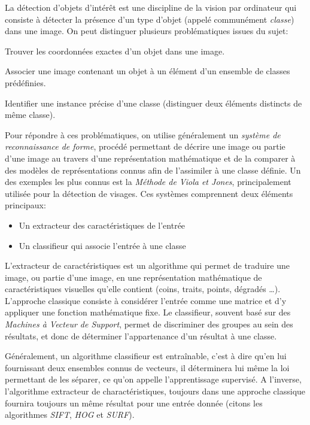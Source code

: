 			La détection d'objets d'intérêt est une discipline de la vision par ordinateur qui consiste à détecter la présence d'un type d'objet (appelé communément \emph{classe}) dans une image. On peut distinguer plusieurs problématiques issues du sujet:
			\begin{description}[noitemsep]
				\item[Localisation:] Trouver les coordonnées exactes d'un objet dans une image.
				\item[Classification:] Associer une image contenant un objet à un élément d'un ensemble de classes prédéfinies.
				\item[Reconnaissance:] Identifier une instance précise d'une classe (distinguer deux éléments distincts de même classe).
			\end{description}
			Pour répondre à ces problématiques, on utilise généralement un \emph{système de reconnaissance de forme}, procédé permettant de décrire une image ou partie d'une image au travers d'une représentation mathématique et de la comparer à des modèles de représentations connus afin de l'assimiler à une classe définie. Un des exemples les plus connus est la \emph{Méthode de Viola et Jones}\cite{viola}, principalement utilisée pour la détection de visages. Ces systèmes comprennent deux éléments principaux:
			\begin{itemize}[noitemsep]
				\item Un extracteur des caractéristiques de l'entrée
				\item Un classifieur qui associe l'entrée à une classe
			\end{itemize}
			L'extracteur de caractéristiques est un algorithme qui permet de traduire une image, ou partie d'une image, en une représentation mathématique de caractéristiques visuelles qu'elle contient (coins, traits, points, dégradés \dots). L'approche classique consiste à considérer l'entrée comme une matrice et d'y appliquer une fonction mathématique fixe.
			Le classifieur, souvent basé sur des \emph{Machines à Vecteur de Support}\cite{svm}, permet de discriminer des groupes au sein des résultats, et donc de déterminer l'appartenance d'un résultat à une classe.
			\par
			Généralement, un algorithme classifieur est entraînable, c'est à dire qu'en lui fournissant deux ensembles connus de vecteurs, il déterminera lui même la loi permettant de les séparer, ce qu'on appelle l'apprentissage supervisé. A l'inverse, l'algorithme extracteur de charactéristiques, toujours dans une approche \og classique \fg{} fournira toujours un même résultat pour une entrée donnée (citons les algorithmes \emph{SIFT}\cite{sift}, \emph{HOG}\cite{hog} et \emph{SURF}\cite{surf}).
			

